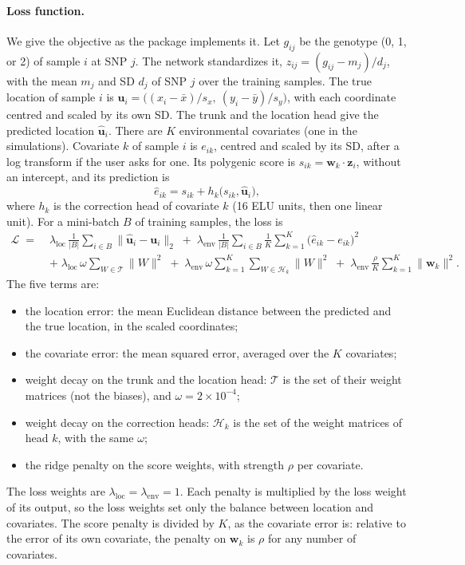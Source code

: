 \paragraph{Loss function.} We give the objective as the \ecolocator
package implements it. Let $g_{ij}$ be the genotype (0, 1, or 2) of
sample $i$ at SNP $j$. The network standardizes it,
$z_{ij} = (g_{ij} - m_j)/d_j$, with the mean $m_j$ and SD $d_j$ of SNP $j$
over the training samples. The true location of sample $i$ is
$\mathbf{u}_i = \big((x_i - \bar{x})/s_x,\ (y_i - \bar{y})/s_y\big)$, with
each coordinate centred and scaled by its own SD. The trunk and the
location head give the predicted location $\hat{\mathbf{u}}_i$. There are
$K$ environmental covariates (one in the simulations). Covariate $k$ of
sample $i$ is $e_{ik}$, centred and scaled by its SD, after a log transform
if the user asks for one. Its polygenic score is
$s_{ik} = \mathbf{w}_k \cdot \mathbf{z}_i$, without an intercept, and its
prediction is
\begin{equation*}
\hat{e}_{ik} = s_{ik} + h_k\big(s_{ik}, \hat{\mathbf{u}}_i\big),
\end{equation*}
where $h_k$ is the correction head of covariate $k$ (16 ELU units, then one
linear unit). For a mini-batch $B$ of training samples, the loss is
\begin{align*}
\mathcal{L} \;=\;& \lambda_{\mathrm{loc}}\, \frac{1}{|B|} \sum_{i \in B}
  \big\lVert \hat{\mathbf{u}}_i - \mathbf{u}_i \big\rVert_2
 \;+\; \lambda_{\mathrm{env}}\, \frac{1}{|B|} \sum_{i \in B} \frac{1}{K}
  \sum_{k=1}^{K} \big(\hat{e}_{ik} - e_{ik}\big)^2 \\
&+\; \lambda_{\mathrm{loc}}\, \omega \sum_{W \in \mathcal{T}} \lVert W \rVert^2
 \;+\; \lambda_{\mathrm{env}}\, \omega \sum_{k=1}^{K} \sum_{W \in \mathcal{H}_k} \lVert W \rVert^2
 \;+\; \lambda_{\mathrm{env}}\, \frac{\rho}{K} \sum_{k=1}^{K} \lVert \mathbf{w}_k \rVert^2 .
\end{align*}
The five terms are:
\begin{itemize}
\item the location error: the mean Euclidean distance between the
  predicted and the true location, in the scaled coordinates;
\item the covariate error: the mean squared error, averaged over the $K$
  covariates;
\item weight decay on the trunk and the location head: $\mathcal{T}$ is the
  set of their weight matrices (not the biases), and $\omega = 2 \times
  10^{-4}$;
\item weight decay on the correction heads: $\mathcal{H}_k$ is the set of
  the weight matrices of head $k$, with the same $\omega$;
\item the ridge penalty on the score weights, with strength $\rho$ per
  covariate.
\end{itemize}
The loss weights are $\lambda_{\mathrm{loc}} = \lambda_{\mathrm{env}} = 1$.
Each penalty is multiplied by the loss weight of its output, so the loss
weights set only the balance between location and covariates. The score
penalty is divided by $K$, as the covariate error is: relative to the
error of its own covariate, the penalty on $\mathbf{w}_k$ is $\rho$ for any
number of covariates.

